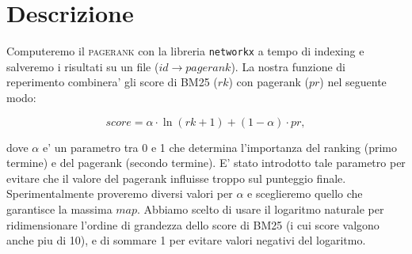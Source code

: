 \documentclass[12pt]{article}
\begin{document}
\maketitle

\section{Descrizione}
Computeremo il \textsc{pagerank} con la libreria \texttt{networkx} a tempo di indexing e salveremo i risultati su un file ($id \rightarrow pagerank$). La nostra funzione di reperimento combinera' gli score di BM25 ($rk$) con pagerank ($pr$) nel seguente modo:

\[ score =  \alpha \cdot \ln (rk+1) + (1-\alpha) \cdot pr,\]

dove $\alpha$ e' un parametro tra 0 e 1 che determina l'importanza del ranking (primo termine) e del pagerank (secondo termine). E' stato introdotto tale parametro per evitare che il valore del pagerank influisse troppo sul punteggio finale. Sperimentalmente proveremo diversi valori per $\alpha$ e sceglieremo quello che garantisce la massima $map$. Abbiamo scelto di usare il logaritmo naturale per ridimensionare l'ordine di grandezza dello score di BM25 (i cui score valgono anche piu di 10), e di sommare 1 per evitare valori negativi del logaritmo.



\end{document}
